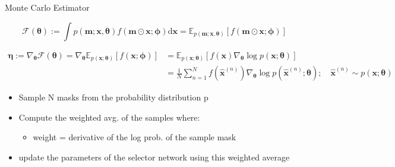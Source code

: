 \documentclass[11pt,compress,t,notes=noshow, aspectratio=169, xcolor=table]{beamer}
\begin{document}
\begin{frame}{Monte Carlo Estimator}
   
\begin{equation*}
     \mathcal{F}(\boldsymbol{\theta}):=\int p(\mathbf{m} ; \mathbf{x}, \boldsymbol{\theta}) f(\mathbf{m} \odot \mathbf{x} ; \boldsymbol{\phi}) \mathrm{d} \mathbf{x}=\mathbb{E}_{p(\mathbf{m} ; \mathbf{x}, \boldsymbol{\theta})}[f(\mathbf{m} \odot \mathbf{x} ; \boldsymbol{\phi})]
\end{equation*}

$$
\begin{aligned}
\boldsymbol{\eta}:=\nabla_{\boldsymbol{\theta}} \mathcal{F}(\boldsymbol{\theta})=\nabla_{\boldsymbol{\theta}} \mathbb{E}_{p(\mathbf{x} ; \boldsymbol{\theta})}[f(\mathbf{x} ; \boldsymbol{\phi})] &=\mathbb{E}_{p(\mathbf{x} ; \boldsymbol{\theta})}\left[f(\mathbf{x}) \nabla_{\boldsymbol{\theta}} \log p(\mathbf{x} ; \boldsymbol{\theta})\right] \\
&=\frac{1}{N} \sum_{n=1}^N f\left(\hat{\mathbf{x}}^{(n)}\right) \nabla_{\boldsymbol{\theta}} \log p\left(\hat{\mathbf{x}}^{(n)} ; \boldsymbol{\theta}\right) ; \quad \hat{\mathbf{x}}^{(n)} \sim p(\mathbf{x} ; \boldsymbol{\theta})
\end{aligned}
$$



    \begin{itemize}
        \item Sample N masks from the probability distribution p
        \item Compute the weighted avg. of the samples where:
        \begin{itemize}
            \item weight = derivative of the log prob. of the sample mask
        \end{itemize}
        \item update the parameters of the selector network using this weighted average
    \end{itemize}
\end{frame}
\end{document}
